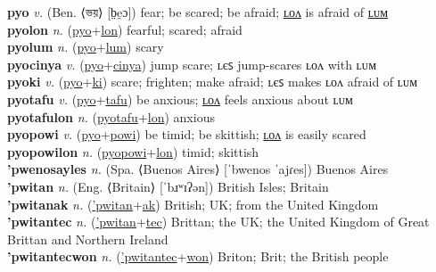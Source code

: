 \textbf{pyo} \textit{v.} (Ben. ⟨ভয়⟩ [b̤e̯ɔ])
fear; be scared; be afraid; \hyperref[pyolon]{ʟᴏᴧ} is afraid of \hyperref[pyolum]{ʟᴜᴍ} \label{pyo} \\
\textbf{pyolon} \textit{n.} (\hyperref[pyo]{pyo}+\hyperref[lon]{lon})
fearful; scared; afraid \label{pyolon} \\
\textbf{pyolum} \textit{n.} (\hyperref[pyo]{pyo}+\hyperref[lum]{lum})
scary \label{pyolum} \\
\textbf{pyocinya} \textit{v.} (\hyperref[pyo]{pyo}+\hyperref[cinya]{cinya})
jump scare; ʟєꜱ jump-scares ʟᴏᴧ with ʟᴜᴍ \label{pyocinya} \\
\textbf{pyoki} \textit{v.} (\hyperref[pyo]{pyo}+\hyperref[ki]{ki})
scare; frighten; make afraid; ʟєꜱ makes ʟᴏᴧ afraid of ʟᴜᴍ \label{pyoki} \\
\textbf{pyotafu} \textit{v.} (\hyperref[pyo]{pyo}+\hyperref[tafu]{tafu})
be anxious; \hyperref[pyotafulon]{ʟᴏᴧ} feels anxious about ʟᴜᴍ \label{pyotafu} \\
\textbf{pyotafulon} \textit{n.} (\hyperref[pyotafu]{pyotafu}+\hyperref[lon]{lon})
anxious \label{pyotafulon} \\
\textbf{pyopowi} \textit{v.} (\hyperref[pyo]{pyo}+\hyperref[powi]{powi})
be timid; be skittish; \hyperref[pyopowilon]{ʟᴏᴧ} is easily scared \label{pyopowi} \\
\textbf{pyopowilon} \textit{n.} (\hyperref[pyopowi]{pyopowi}+\hyperref[lon]{lon})
timid; skittish \label{pyopowilon} \\
\textbf{'pwenosayles} \textit{n.} (Spa. ⟨Buenos Aires⟩ [ˈbwenos ˈajɾes])
Buenos Aires \label{'pwenosayles} \\
\textbf{'pwitan} \textit{n.} (Eng. ⟨Britain⟩ [ˈbɹʷɪʔən])
British Isles; Britain \label{'pwitan} \\
\textbf{'pwitanak} \textit{n.} (\hyperref['pwitan]{'pwitan}+\hyperref[ak]{ak})
British; UK; from the United Kingdom \label{'pwitanak} \\
\textbf{'pwitantec} \textit{n.} (\hyperref['pwitan]{'pwitan}+\hyperref[tec]{tec})
Brittan; the UK; the United Kingdom of Great Brittan and Northern Ireland \label{'pwitantec} \\
\textbf{'pwitantecwon} \textit{n.} (\hyperref['pwitantec]{'pwitantec}+\hyperref[won]{won})
Briton; Brit; the British people \label{'pwitantecwon} \\
